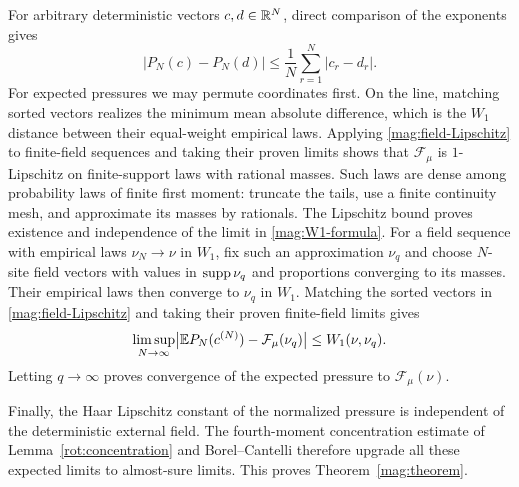 For arbitrary deterministic vectors $c,d\in\mathbb R^N$, direct comparison of
the exponents gives
\begin{equation}\label{mag:field-Lipschitz}
 |P_N(c)-P_N(d)|\le\frac1N\sum_{r=1}^N|c_r-d_r|.
\end{equation}
For expected pressures we may permute coordinates first. On the line,
matching sorted vectors realizes the minimum mean absolute difference,
which is the $W_1$ distance between their equal-weight empirical laws.
Applying \eqref{mag:field-Lipschitz} to finite-field sequences and taking
their proven limits shows that $\mathcal F_\mu$ is $1$-Lipschitz on
finite-support laws with rational masses. Such laws are dense among
probability laws of finite first moment: truncate the tails, use a finite
continuity mesh, and approximate its masses by rationals. The Lipschitz
bound proves existence and independence of the limit in
\eqref{mag:W1-formula}. For a field sequence with empirical laws
$\nu_N\to\nu$ in $W_1$, fix
such an approximation $\nu_q$ and choose $N$-site field vectors with values
in $\operatorname{supp}\nu_q$ and proportions converging to its masses. Their empirical
laws then converge to $\nu_q$ in $W_1$. Matching the sorted vectors in
\eqref{mag:field-Lipschitz} and taking their proven finite-field limits gives
\[
 \limsup_{N\to\infty}
 \bigl|\mathbb E P_N(c^{(N)})-\mathcal F_\mu(\nu_q)\bigr|
 \le W_1(\nu,\nu_q).
\]
Letting $q\to\infty$ proves convergence of the expected pressure to
$\mathcal F_\mu(\nu)$.

Finally, the Haar Lipschitz constant of the normalized pressure is
independent of the deterministic external field. The fourth-moment
concentration estimate of Lemma~\ref{rot:concentration} and
Borel--Cantelli therefore upgrade all these expected limits to
almost-sure limits. This proves Theorem~\ref{mag:theorem}.
